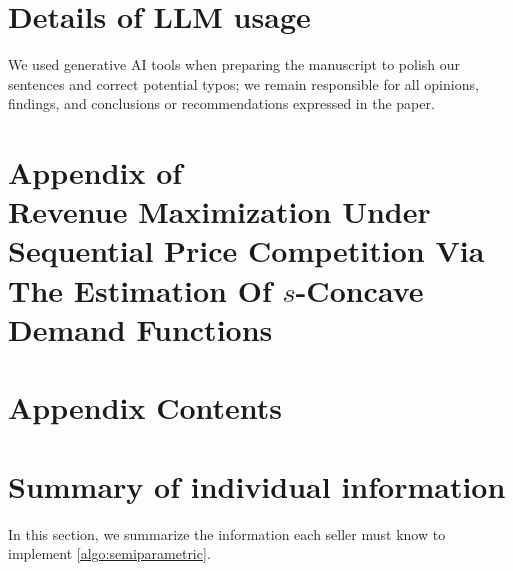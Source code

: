 \documentclass{article} %
\begin{document}
\section{Details of LLM usage}
We used generative AI tools when preparing the manuscript to polish our sentences and correct potential typos; we remain responsible for all opinions, findings, and conclusions or recommendations expressed in the paper.




\newpage
\section*{\centering \Large Appendix of \\
Revenue Maximization Under Sequential Price Competition Via The Estimation Of $s$-Concave Demand Functions}
\appendix

\startcontents[appendix]

\section*{Appendix Contents}


\newpage
\section{Summary of individual information}\label{app:known_values}

In this section, we summarize the information each seller must know to implement \cref{algo:semiparametric}.
\end{document}
